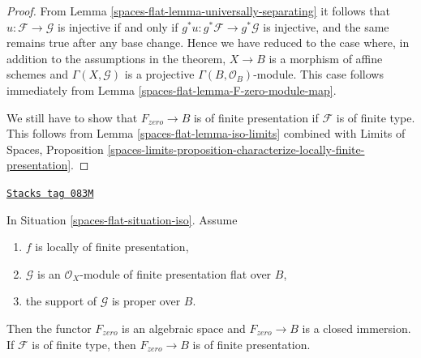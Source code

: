 \begin{proof}
\medskip\noindent
From Lemma \ref{spaces-flat-lemma-universally-separating}
it follows that $u : \mathcal{F} \to \mathcal{G}$ is injective if and only if
$g^*u : g^*\mathcal{F} \to g^*\mathcal{G}$ is injective, and the same remains
true after any base change. Hence we have reduced to the case where,
in addition to the assumptions in the theorem, $X \to B$ is a morphism of
affine schemes and $\Gamma(X, \mathcal{G})$ is a projective
$\Gamma(B, \mathcal{O}_B)$-module. This case follows immediately from
Lemma \ref{spaces-flat-lemma-F-zero-module-map}.

\medskip\noindent
We still have to show that $F_{zero} \to B$ is of finite presentation if
$\mathcal{F}$ is of finite type. This follows from
Lemma \ref{spaces-flat-lemma-iso-limits} combined with
Limits of Spaces, Proposition
\ref{spaces-limits-proposition-characterize-locally-finite-presentation}.
\end{proof}

\begin{lemma}
\label{spaces-flat-lemma-F-zero-closed-proper}
\href{https://stacks.math.columbia.edu/tag/083M}{\texttt{Stacks tag 083M}}

In Situation \ref{spaces-flat-situation-iso}. Assume
\begin{enumerate}
\item $f$ is locally of finite presentation,
\item $\mathcal{G}$ is an $\mathcal{O}_X$-module of finite presentation
flat over $B$,
\item the support of $\mathcal{G}$ is proper over $B$.
\end{enumerate}
Then the functor $F_{zero}$ is an algebraic space and $F_{zero} \to B$
is a closed immersion. If $\mathcal{F}$ is of finite type, then
$F_{zero} \to B$ is of finite presentation.
\end{lemma}

